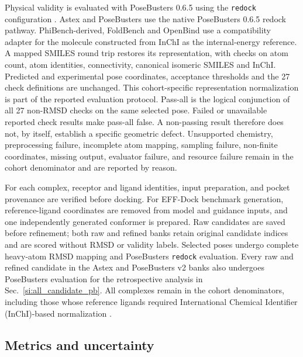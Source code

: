 \documentclass{article}
\newcommand{\citep}[1]{\cite{#1}}
\begin{document}
Physical validity is evaluated with PoseBusters 0.6.5 using the \texttt{redock} configuration \citep{buttenschoen2024posebusters}.
Astex and PoseBusters use the native PoseBusters 0.6.5 redock pathway. PhiBench-derived, FoldBench and OpenBind use a compatibility adapter for the molecule constructed from InChI as the internal-energy reference. A mapped SMILES round trip restores its representation, with checks on atom count, atom identities, connectivity, canonical isomeric SMILES and InChI. Predicted and experimental pose coordinates, acceptance thresholds and the 27 check definitions are unchanged. This cohort-specific representation normalization is part of the reported evaluation protocol.
Pass-all is the logical conjunction of all 27 non-RMSD checks on the same selected pose.
Failed or unavailable reported check results make pass-all false. A non-passing result therefore does not, by itself, establish a specific geometric defect.
Unsupported chemistry, preprocessing failure, incomplete atom mapping, sampling failure, non-finite coordinates, missing output, evaluator failure, and resource failure remain in the cohort denominator and are reported by reason.

For each complex, receptor and ligand identities, input preparation, and pocket provenance are verified before docking.
For EFF-Dock benchmark generation, reference-ligand coordinates are removed from model and guidance inputs, and one independently generated conformer is prepared.
Raw candidates are saved before refinement; both raw and refined banks retain original candidate indices and are scored without RMSD or validity labels.
Selected poses undergo complete heavy-atom RMSD mapping and PoseBusters \texttt{redock} evaluation. Every raw and refined candidate in the Astex and PoseBusters v2 banks also undergoes PoseBusters evaluation for the retrospective analysis in Sec.~\ref{si:all_candidate_pb}.
All complexes remain in the cohort denominators, including those whose reference ligands required International Chemical Identifier (InChI)-based normalization \citep{heller2015inchi}.

\subsection{Metrics and uncertainty}
\end{document}
